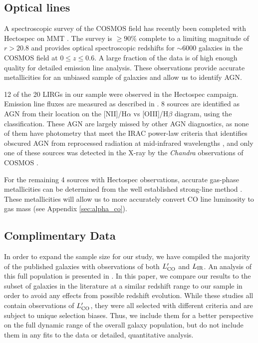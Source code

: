 \documentclass[a4paper,fleqn,usenatbib]{mnras}
\newcommand{\lir}{L_{\rm{IR}}}
\newcommand{\lco}{L'_{\rm{CO}}}
\begin{document}
\subsection{Optical lines}

A spectroscopic survey of the COSMOS field has recently been completed with Hectospec on MMT \citep{2005PASP..117.1411F}. The survey is $\geq90\%$ complete to a limiting magnitude of $r>20.8$ \citep{2015ApJ...815..104D,2016ApJ...821..101Z} and provides optical spectroscopic redshifts for $\sim6000$ galaxies in the COSMOS field at $0\leq z \leq 0.6$. A large fraction of the data is of high enough quality for detailed emission line analysis. These observations provide accurate metallicities for an unbiased sample of galaxies and allow us to identify AGN.  

12 of the 20 LIRGs in our sample were observed in the Hectospec campaign.  Emission line fluxes are measured as described in \citet{2011ApJ...730..137Z}.  8 sources are identified as AGN from their location on the [NII]/H$\alpha$ vs [OIII]/H$\beta$ diagram, using the \citet{2006MNRAS.372..961K} classification. These AGN are largely missed by other AGN diagnostics, as none of them have photometry that meet the IRAC power-law criteria that identifies obscured AGN from reprocessed radiation at mid-infrared wavelengths \citep{2008ApJ...687..111D,2012ApJ...748..142D}, and only one of these sources was detected in the X-ray by the {\em Chandra} observations of COSMOS \citep[C-COSMOS;][]{2009ApJS..184..158E,2016ApJ...819...62C}. 

For the remaining 4 sources with Hectospec observations, accurate gas-phase metallicities can be determined from the well established strong-line method \citep{2004ApJ...617..240K}. These metallicities will allow us to more accurately convert CO line luminosity to gas mass (see Appendix \ref{sec:alpha_co}).



\subsection{Complimentary Data}

In order to expand the sample size for our study, we have compiled the majority of the published galaxies with observations of both $\lco$ and $\lir$. An analysis of this full population is presented in \citet{Cortzen_Thesis}. In this paper, we compare our results to the subset of galaxies in the literature at a similar redshift range to our sample \citep[$z \sim 0.1$--0.6;][]{2011A&A...528A.124C,2013ApJ...768..132B,2014ApJ...796...63M} in order to avoid any effects from possible redshift evolution.  While these studies all contain observations of $\lco$, they were all selected with different criteria and are subject to unique selection biases. Thus, we include them for a better perspective on the full dynamic range of the overall galaxy population, but do not include them in any fits to the data or detailed, quantitative analysis. 
\end{document}
